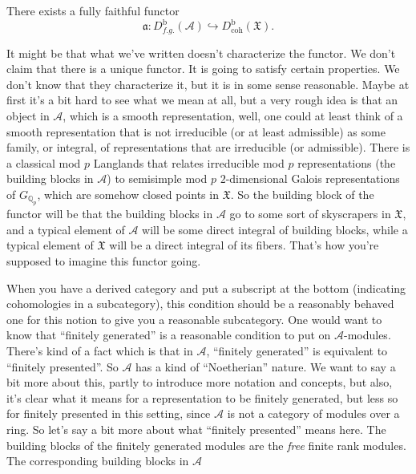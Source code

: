 \documentclass[reqno]{amsart} 
\begin{document}
\begin{theorem}
  There exists a fully faithful functor
  \begin{equation*}
    \mathfrak{a} : D_{f .g.}^{\mathrm{b}}(\mathcal{A}) \hookrightarrow D_{\mathrm{coh}}^{\mathrm{b}}(\mathfrak{X}).
  \end{equation*}
\end{theorem}
\begin{remark}
  It might be that what we've written doesn't characterize the functor.  We don't claim that there is a unique functor.  It is going to satisfy certain properties.  We don't know that they characterize it, but it is in some sense reasonable.  Maybe at first it's a bit hard to see what we mean at all, but a very rough idea is that an object in $\mathcal{A}$, which is a smooth representation, well, one could at least think of a smooth representation that is not irreducible (or at least admissible) as some family, or integral, of representations that are irreducible (or admissible).  There is a classical mod $p$ Langlands that relates irreducible mod $p$ representations (the building blocks in $\mathcal{A}$) to semisimple mod $p$ $2$-dimensional Galois representations of $G_{\mathbb{Q}_p}$, which are somehow closed points in $\mathfrak{X}$.  So the building block of the functor will be that the building blocks in $\mathcal{A}$ go to some sort of skyscrapers in $\mathfrak{X}$, and a typical element of $\mathcal{A}$ will be some direct integral of building blocks, while a typical element of $\mathfrak{X}$ will be a direct integral of its fibers.  That's how you're supposed to imagine this functor going.
\end{remark}

When you have a derived category and put a subscript at the bottom (indicating cohomologies in a subcategory), this condition should be a reasonably behaved one for this notion to give you a reasonable subcategory.  One would want to know that ``finitely generated'' is a reasonable condition to put on $\mathcal{A}$-modules.  There's kind of a fact which is that in $\mathcal{A}$, ``finitely generated'' is equivalent to ``finitely presented''.  So $\mathcal{A}$ has a kind of ``Noetherian'' nature.  We want to say a bit more about this, partly to introduce more notation and concepts, but also, it's clear what it means for a representation to be finitely generated, but less so for finitely presented in this setting, since $\mathcal{A}$ is not a category of modules over a ring.  So let's say a bit more about what ``finitely presented'' means here.  The building blocks of the finitely generated modules are the \emph{free} finite rank modules.  The corresponding building blocks in $\mathcal{A}$
\end{document}
